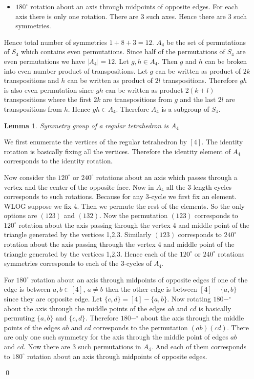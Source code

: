 \documentclass[a4paper, 11pt]{article}
\newtheorem{lemma}{Lemma}
\renewenvironment{proof}{\noindent{\it \textbf{Proof:}}\hspace*{1em}}{\hfill\qed\bigskip\\}
\begin{document}
{\begin{itemize}
\begin{itemize}
	\item $180^{\circ}$ rotation about an axis through midpoints of opposite edges. For each axis there is only one rotation. There are 3 such axes. Hence there are $3$ such symmetries.
\end{itemize}Hence total number of symmetries $1+8+3=12$. $A_4$ be the set of permutations of $S_4$ which contains even permutations. Since half of the permutations of $S_4$ are even permutations we have $|A_4|=12$. Let $g,h\in A_4$. Then $g$ and $h$ can be broken into even number product of transpositions. Let $g$ can be written as product of $2k$ transpositions and $h$ can be written as product of $2l$ transpositions.  Therefore $gh$ is also even permutation since $gh$ can be written as product $2(k+l)$ transpositions where the first $2k$ are transpositions from $g$ and the last $2l$ are transpositions from  $h$. Hence $gh\in A_4$. Therefore $A_4$ is a subgroup of $S_4$.\parinn

\begin{lemma}
	Symmetry group of a regular tetrahedron is $A_4$
\end{lemma}
\begin{proof}
	We first enumerate the vertices of the regular tetrahedron by $[4]$. The identity rotation is basically fixing all the vertices. Therefore the identity element of $A_4$  corresponds to the identity rotation.
	
	Now consider the $120^{\circ}$ or $240^{\circ}$ rotations about an axis which passes through a vertex and the center of the opposite face. Now in $A_4$ all the 3-length cycles corresponds to such rotations. Because for any 3-cycle we first fix an element. WLOG suppose we fix 4. Then we permute the rest of the elements. So the only options are $(123)$ and $(132)$. Now the permutation $(123)$ corresponds to $120^{\circ}$ rotation about the axis passing through  the vertex 4 and middle point of the triangle generated by the vertices 1,2,3. Similarly $(123)$ corresponds to $240^{\circ}$ rotation about the axis passing through  the vertex 4 and middle point of the triangle generated by the vertices 1,2,3. Hence each of the  $120^{\circ}$ or $240^{\circ}$ rotations symmetries corresponds to each of the 3-cycles of $A_4$. 
	
	For $180^{\circ}$ rotation about an axis through midpoints of opposite edges if one of the edge is between $a,b\in [4]$, $a\neq b$ then the other edge is between $[4]-\{a,b\}$ since they are opposite edge. Let $\{c,d\}=[4]-\{a,b\}$. Now rotating $180-^{\circ}$ about the axis through the middle points of the edges $ab$ and $cd$ is basically permuting $\{a,b\}$ and $\{c,d\}$. Therefore $180-^{\circ}$ about the axis through the middle points of the edges $ab$ and $cd$ corresponds to the permutation $(ab)(cd)$. There are only one such symmetry for the axis through the middle point of edges $ab$ and $cd$. Now there are $3$ such permutations in $A_4$. And each of them corresponds to $180^{\circ}$ rotation about an axis through midpoints of opposite edges. 
	

\end{proof}
\end{itemize}}
\end{document}
